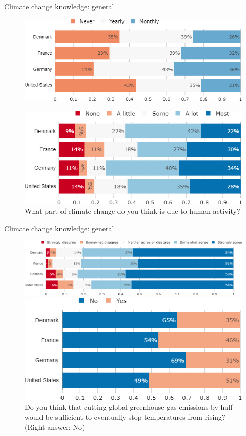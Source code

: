 \documentclass[aspectratio=169,9pt,dvipsnames]{beamer}
\begin{document}
\begin{frame}{Climate change knowledge: general}%
\begin{figure}[h!]
\centering
\caption{How often do you think or talk with people about climate change?}
\includegraphics[width=.6\textwidth]{../figures/country_comparison/CC_talks_countries.png}\\
\centering
\caption{What part of climate change do you think is due to human activity?}
\includegraphics[width=.6\textwidth]{../figures/country_comparison/CC_anthropogenic_countries.png}
\end{figure}
\end{frame}


\begin{frame}{Climate change knowledge: general}%
\begin{figure}[h!]
\centering
\caption{Do you agree or disagree with the following statement: ``Climate change is an important problem."?}
\includegraphics[width=.6\textwidth]{../figures/country_comparison/CC_problem_countries.png}
\centering
\caption{Do you think that cutting global greenhouse gas emissions by half would be sufficient to eventually stop temperatures from rising? (Right answer: No)}
\includegraphics[width=.6\textwidth]{../figures/country_comparison/CC_dynamic_countries.png}
\end{figure}
\end{frame}
\end{document}
